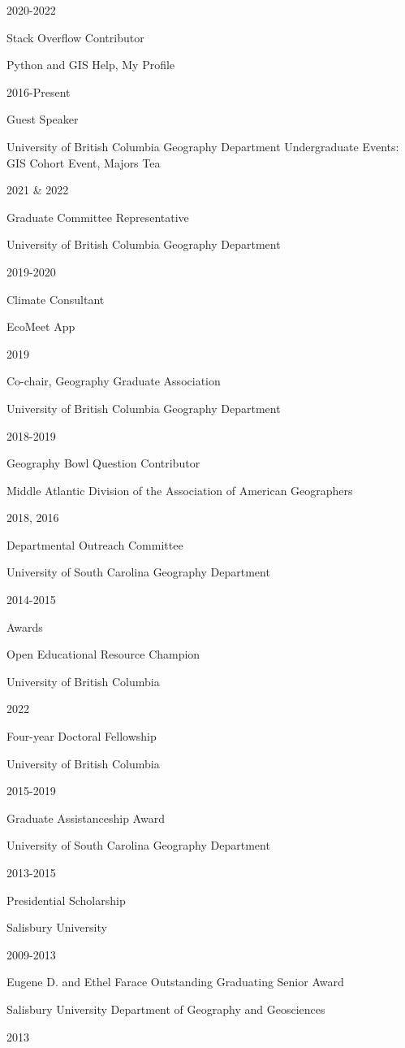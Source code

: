 \documentclass[
]{article}
\begin{document}
2020-2022

Stack Overflow Contributor

Python and GIS Help, My Profile

2016-Present

Guest Speaker

University of British Columbia Geography Department Undergraduate
Events: GIS Cohort Event, Majors Tea

2021 \& 2022

Graduate Committee Representative

University of British Columbia Geography Department

2019-2020

Climate Consultant

EcoMeet App

2019

Co-chair, Geography Graduate Association

University of British Columbia Geography Department

2018-2019

Geography Bowl Question Contributor

Middle Atlantic Division of the Association of American Geographers

2018, 2016

Departmental Outreach Committee

University of South Carolina Geography Department

2014-2015

Awards

Open Educational Resource Champion

University of British Columbia

2022

Four-year Doctoral Fellowship

University of British Columbia

2015-2019

Graduate Assistanceship Award

University of South Carolina Geography Department

2013-2015

Presidential Scholarship

Salisbury University

2009-2013

Eugene D. and Ethel Farace Outstanding Graduating Senior Award

Salisbury University Department of Geography and Geosciences

2013
\end{document}
